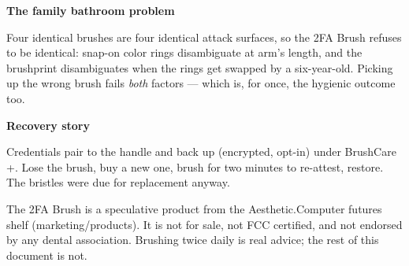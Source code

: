 \documentclass[11pt]{article}
\newcommand{\modgap}{\par\vspace{1.05em plus 0.5em minus 0.45em}}
\newcommand{\pagefoot}{\par\vspace{2pt plus 1fil}\null}
\newcommand{\acdot}{\textcolor{keyindigo}{.}}
\newcommand{\subhead}[2]{{\acprocessing\fontsize{15pt}{17pt}\bfseries\selectfont%
  \makebox[0pt][l]{\raisebox{-0.9pt}{\hspace{0.9pt}\textcolor{acink!40}{#2}}}%
  \textcolor{#1}{#2}}}
\newcommand{\cellbgcolor}{cellbg}
\newcommand{\cathead}[2]{%
  \renewcommand{\cellbgcolor}{#1!8}%
  \subhead{#1}{#2}%
  \par\nopagebreak\vspace{0.55em}
}
\begin{document}
\modgap

\cathead{brushmint}{The family bathroom problem}
Four identical brushes are four identical attack surfaces, so the 2FA
Brush refuses to be identical: snap-on color rings disambiguate at
arm's length, and the brushprint disambiguates when the rings get
swapped by a six-year-old. Picking up the wrong brush fails
\textit{both} factors --- which is, for once, the hygienic outcome too.

\modgap

\cathead{brushslate}{Recovery story}
Credentials pair to the handle and back up (encrypted, opt-in) under
BrushCare\,+. Lose the brush, buy a new one, brush for two minutes to
re-attest, restore. The bristles were due for replacement anyway.

\vspace{0.6em}
{\acberkeley\footnotesize\textcolor{acink!70}{The 2FA Brush is a
speculative product from the Aesthetic\acdot Computer futures shelf
(marketing/products). It is not for sale, not FCC certified, and not
endorsed by any dental association. Brushing twice daily is real
advice; the rest of this document is not.}}

\pagefoot
\end{document}
